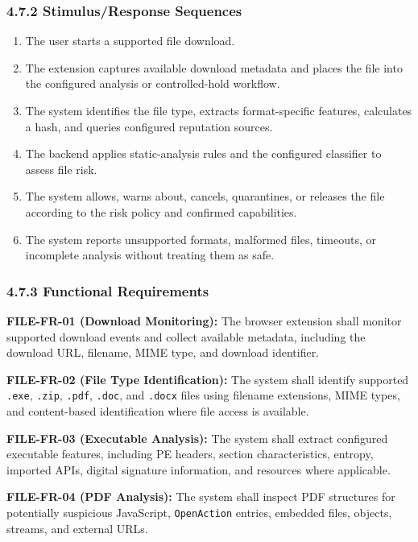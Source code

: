 \documentclass[12pt,a4paper]{report}
\begin{document}
\subsubsection*{4.7.2 Stimulus/Response Sequences}

\begin{enumerate}
\item The user starts a supported file download.
\item The extension captures available download metadata and places the file into the configured analysis or controlled-hold workflow.
\item The system identifies the file type, extracts format-specific features, calculates a hash, and queries configured reputation sources.
\item The backend applies static-analysis rules and the configured classifier to assess file risk.
\item The system allows, warns about, cancels, quarantines, or releases the file according to the risk policy and confirmed capabilities.
\item The system reports unsupported formats, malformed files, timeouts, or incomplete analysis without treating them as safe.
\end{enumerate}

\subsubsection*{4.7.3 Functional Requirements}

\textbf{FILE-FR-01 (Download Monitoring):} The browser extension shall monitor supported download events and collect available metadata, including the download URL, filename, MIME type, and download identifier.\par

\textbf{FILE-FR-02 (File Type Identification):} The system shall identify supported \texttt{.exe}, \texttt{.zip}, \texttt{.pdf}, \texttt{.doc}, and \texttt{.docx} files using filename extensions, MIME types, and content-based identification where file access is available.\par

\textbf{FILE-FR-03 (Executable Analysis):} The system shall extract configured executable features, including PE headers, section characteristics, entropy, imported APIs, digital signature information, and resources where applicable.\par

\textbf{FILE-FR-04 (PDF Analysis):} The system shall inspect PDF structures for potentially suspicious JavaScript, \texttt{OpenAction} entries, embedded files, objects, streams, and external URLs.\par
\end{document}
